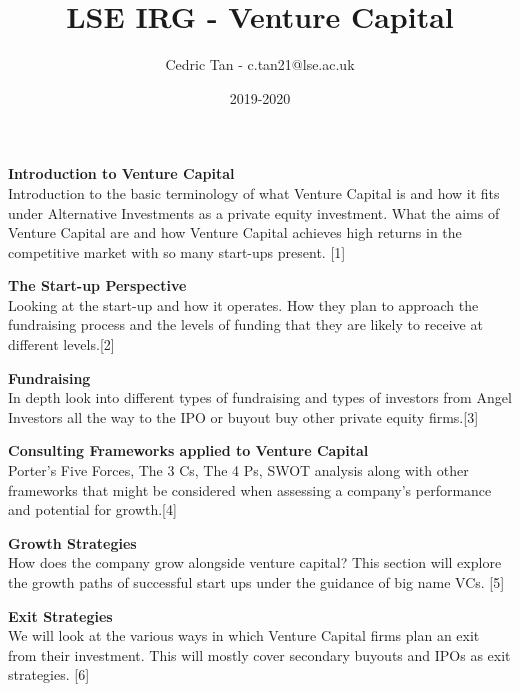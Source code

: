 \documentclass[a4paper]{article}
\title{LSE IRG - Venture Capital}
\author{Cedric Tan - c.tan21@lse.ac.uk}
\date {2019-2020}
\begin{document}
\maketitle
{\small
  \noindent\textbf{Introduction to Venture Capital}\\
  Introduction to the basic terminology of what Venture Capital is and how it fits under Alternative Investments as a private equity investment. What the aims of Venture Capital are and how Venture Capital achieves high returns in the competitive market with so many start-ups present. \hspace*{\fill}[1]

  \vspace{10pt}
  \noindent\textbf{The Start-up Perspective}\\
  Looking at the start-up and how it operates. How they plan to approach the fundraising process and the levels of funding that they are likely to receive at different levels.\hspace*{\fill}[2]
   
  \vspace{10pt}
  \noindent\textbf{Fundraising}\\
  \noindent In depth look into different types of fundraising and types of investors from Angel Investors all the way to the IPO or buyout buy other private equity firms.\hspace*{\fill}[3]

  \vspace{10pt}
  \noindent\textbf{Consulting Frameworks applied to Venture Capital}\\
  Porter's Five Forces, The 3 Cs, The 4 Ps, SWOT analysis along with other frameworks that might be considered when assessing a company's performance and potential for growth.\hspace*{\fill}[4]

  \vspace{10pt}
  \noindent\textbf{Growth Strategies}\\
  How does the company grow alongside venture capital? This section will explore the growth paths of successful start ups under the guidance of big name VCs.  \hspace*{\fill}[5]

  \vspace{10pt}
  \noindent\textbf{Exit Strategies}\\
  We will look at the various ways in which Venture Capital firms plan an exit from their investment. This will mostly cover secondary buyouts and IPOs as exit strategies. \hspace*{\fill}[6]

}
\end{document}
